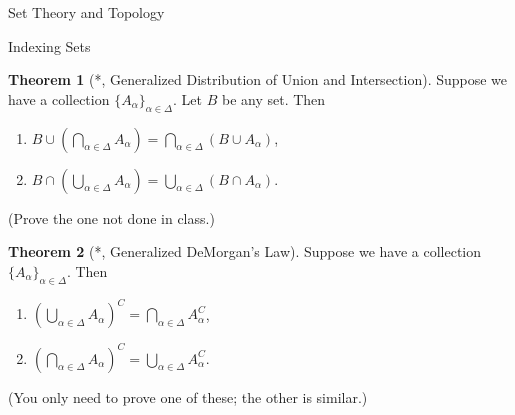 \documentclass[11pt]{article}
\theoremstyle{definition}
\newtheorem{theorem}{Theorem}[section]
\begin{document}
\begin{section}{Set Theory and Topology}
\begin{subsection}{Indexing Sets}
\begin{theorem}[*, Generalized Distribution of Union and Intersection]
Suppose we have a collection $\{A_{\alpha}\}_{\alpha\in\Delta}$.  Let $B$ be any set.  Then
\begin{enumerate}
\item $\displaystyle B \cup \left(\bigcap_{\alpha\in\Delta}A_{\alpha}\right)=\bigcap_{\alpha\in\Delta}(B\cup A_{\alpha})$,
\item $\displaystyle B \cap \left(\bigcup_{\alpha\in\Delta}A_{\alpha}\right)=\bigcup_{\alpha\in\Delta}(B\cap A_{\alpha})$.
\end{enumerate}
(Prove the one not done in class.)
\end{theorem}

\begin{theorem}[*, Generalized DeMorgan's Law]
Suppose we have a collection $\{A_{\alpha}\}_{\alpha\in\Delta}$.  Then
\begin{enumerate}
\item $\displaystyle \left(\bigcup_{\alpha\in\Delta} A_{\alpha}\right)^C=\bigcap_{\alpha\in\Delta}A_{\alpha}^{C}$,
\item $\displaystyle \left(\bigcap_{\alpha\in\Delta} A_{\alpha}\right)^C=\bigcup_{\alpha\in\Delta}A_{\alpha}^{C}$.
\end{enumerate}
(You only need to prove one of these; the other is similar.)
\end{theorem}

\end{subsection}

\end{section}
\end{document}
